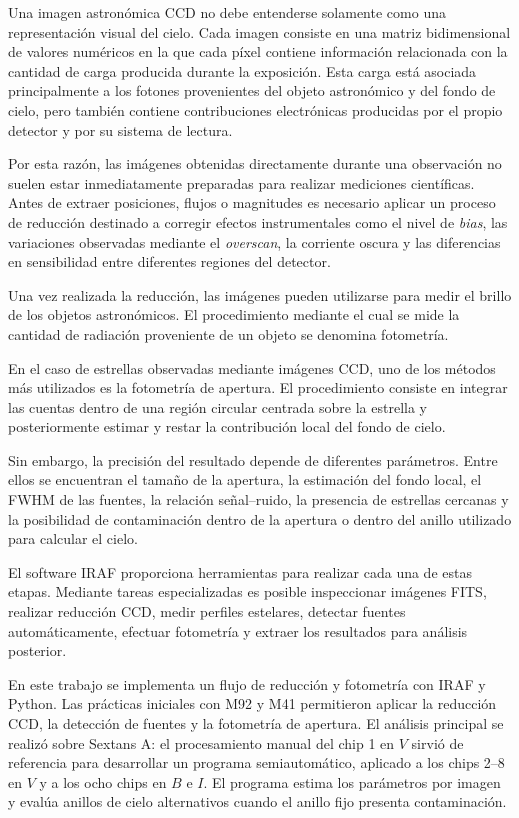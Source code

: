 \documentclass[12pt,letterpaper,oneside]{book}
\begin{document}
Una imagen astronómica CCD no debe entenderse solamente como una representación visual del cielo. Cada imagen consiste en una matriz bidimensional de valores numéricos en la que cada píxel contiene información relacionada con la cantidad de carga producida durante la exposición. Esta carga está asociada principalmente a los fotones provenientes del objeto astronómico y del fondo de cielo, pero también contiene contribuciones electrónicas producidas por el propio detector y por su sistema de lectura.

Por esta razón, las imágenes obtenidas directamente durante una observación no suelen estar inmediatamente preparadas para realizar mediciones científicas. Antes de extraer posiciones, flujos o magnitudes es necesario aplicar un proceso de reducción destinado a corregir efectos instrumentales como el nivel de \textit{bias}, las variaciones observadas mediante el \textit{overscan}, la corriente oscura y las diferencias en sensibilidad entre diferentes regiones del detector.

Una vez realizada la reducción, las imágenes pueden utilizarse para medir el brillo de los objetos astronómicos. El procedimiento mediante el cual se mide la cantidad de radiación proveniente de un objeto se denomina fotometría.

En el caso de estrellas observadas mediante imágenes CCD, uno de los métodos más utilizados es la fotometría de apertura. El procedimiento consiste en integrar las cuentas dentro de una región circular centrada sobre la estrella y posteriormente estimar y restar la contribución local del fondo de cielo.

Sin embargo, la precisión del resultado depende de diferentes parámetros. Entre ellos se encuentran el tamaño de la apertura, la estimación del fondo local, el FWHM de las fuentes, la relación señal--ruido, la presencia de estrellas cercanas y la posibilidad de contaminación dentro de la apertura o dentro del anillo utilizado para calcular el cielo.

El software IRAF proporciona herramientas para realizar cada una de estas etapas. Mediante tareas especializadas es posible inspeccionar imágenes FITS, realizar reducción CCD, medir perfiles estelares, detectar fuentes automáticamente, efectuar fotometría y extraer los resultados para análisis posterior.

En este trabajo se implementa un flujo de reducción y fotometría con IRAF y Python. Las prácticas iniciales con M92 y M41 permitieron aplicar la reducción CCD, la detección de fuentes y la fotometría de apertura. El análisis principal se realizó sobre Sextans A: el procesamiento manual del chip 1 en $V$ sirvió de referencia para desarrollar un programa semiautomático, aplicado a los chips 2--8 en $V$ y a los ocho chips en $B$ e $I$. El programa estima los parámetros por imagen y evalúa anillos de cielo alternativos cuando el anillo fijo presenta contaminación.
\end{document}
